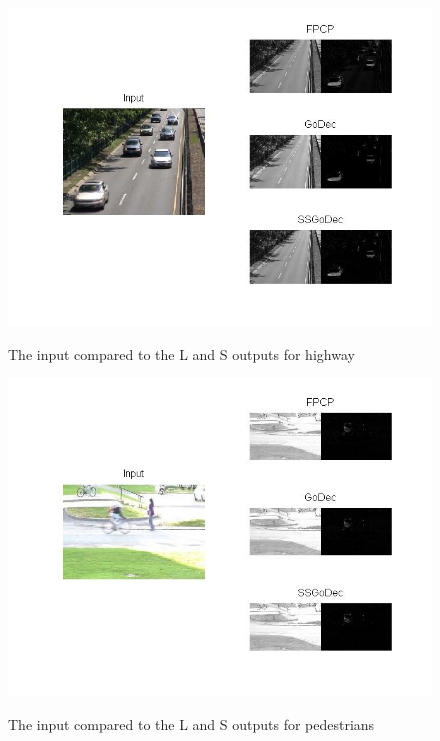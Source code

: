 \documentclass[conference]{IEEEtran}
\begin{document}
\begin{figure}[H]
\begin{center}  
\noindent
  \includegraphics[width=.8\columnwidth]{highway2}
  \caption{The input compared to the L and S outputs for highway} \label{fig:output2_1}
  \noindent
  \includegraphics[width=.8\columnwidth]{pedestrians2}
  \caption{The input compared to the L and S outputs for pedestrians} \label{fig:output2_2}
\end{center}
\end{figure}
\end{document}
